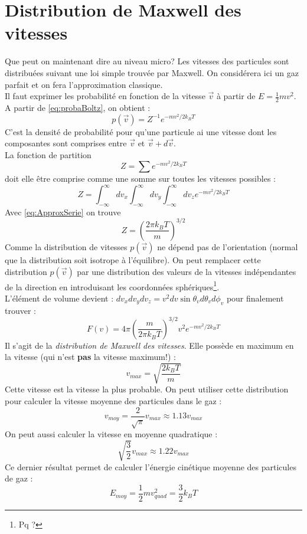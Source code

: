 \documentclass	[11pt, a4paper, openany]{book}
\begin{document}
\section{Distribution de Maxwell des vitesses}
Que peut on maintenant dire au niveau micro? Les vitesses des particules sont distribuées suivant
une loi simple trouvée par Maxwell. On considérera ici un gaz parfait et on fera l'approximation
classique.\\
Il faut exprimer les probabilité en fonction de la vitesse $\vec{v}$ à partir de $E = \frac{1}{2}
mv^2$. A partir de \autoref{eq:probaBoltz}, on obtient :
\begin{equation}
p(\vec{v}) = Z^{-1}e^{-mv^2/2k_BT}
\end{equation}
C'est la densité de probabilité pour qu'une particule ai une vitesse dont les composantes sont 
comprises entre $\vec{v}$ et $\vec{v} +d\vec{v}$.\\
La fonction de partition
\begin{equation}
Z = \sum e^{-mv^2/2k_BT}
\end{equation}
doit elle être comprise comme une somme sur toutes les vitesses possibles :
\begin{equation}
Z = \int_{-\infty}^\infty dv_x \int_{-\infty}^\infty dv_y \int_{-\infty}^\infty dv_z 
e^{-mv^2/2k_BT}
\end{equation}
Avec \autoref{eq:ApproxSerie} on trouve
\begin{equation}
Z = \left(\dfrac{2\pi k_BT}{m}\right)^{3/2}
\end{equation}
Comme la distribution de vitesses $p(\vec{v})$ ne dépend pas de l'orientation (normal que la 
distribution soit isotrope à l'équilibre). On peut remplacer cette distribution $p(\vec{v})$ 
par une distribution des valeurs de la vitesses indépendantes de la direction en introduisant
les coordonnées sphériques\footnote{Pq ?}.\\
L'élément de volume devient : $dv_xdv_ydv_z = v^2dv\sin\theta_vd\theta_vd\phi_v$ pour finalement
trouver :
\begin{equation}
F(v) = 4\pi\left(\dfrac{m}{2\pi k_BT}\right)^{3/2} v^2 e^{-mv^2/2k_BT}
\end{equation}
Il s'agit de la \textit{distribution de Maxwell des vitesses}. Elle possède en maximum en la 
vitesse (qui n'est \textbf{pas} la vitesse maximum!) : 
\begin{equation}
v_{max} = \sqrt{\dfrac{2k_BT}{m}}
\end{equation}
Cette vitesse est la vitesse la plus probable. On peut utiliser cette distribution pour calculer 
la vitesse moyenne des particules dans le gaz :
\begin{equation}
v_{moy} = \frac{2}{\sqrt{\pi}}v_{max} \approx 1.13 v_{max}
\end{equation}
On peut aussi calculer la vitesse en moyenne quadratique :
\begin{equation}
\sqrt{\frac{3}{2}}v_{max} \approx 1.22 v_{max}
\end{equation}
Ce dernier résultat permet de calculer l'énergie cinétique moyenne des particules de gaz :
\begin{equation}
E_{moy} = \frac{1}{2}mv^2_{quad} = \frac{3}{2}k_BT
\end{equation}
\end{document}
